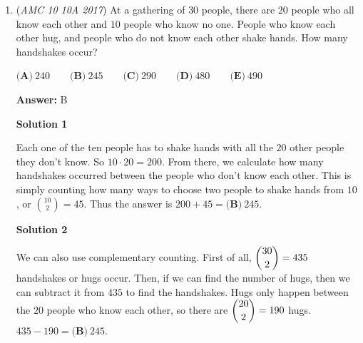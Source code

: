 \begin{enumerate}
Let $j$ represent how far Jerry walked, and $s$ represent how far Silvia walked. Since the field is a square, and Jerry walked two sides of it, while Silvia walked the diagonal, we can simply define the side of the square field to be one, and find the distances they walked. Since Jerry walked two sides, $j = 2$Since Silvia walked the diagonal, she walked the hypotenuse of a $45$, $45$, $90$ triangle with leg length $1$. Thus,$s = \sqrt{2} = 1.414...$We can then take $\frac{j-s}{j} \approx \frac{2 - 1.4}{2}=0.3 \implies \boxed{\textbf{(A)}\ 30\%}$




\textbf{Solution 2}

We can assume that Jerry's path is $100$ units in length. By that logic, Silvia's path is $\frac{100\cdot\sqrt{2}}{2}=50\sqrt{2}$. We can assume that $\sqrt{2}\approx1.4$, so we find that Sylvia's path is $70$ units in length. We can now subtract the two paths, and find out that the answer is $\boxed{\textbf{(A)}\ 30\%}$.~demonhunter

 (TheBeautyofMath)

 


	\item (\textit{AMC 10 10A 2017}) At a gathering of $30$ people, there are $20$ people who all know each other and $10$ people who know no one. People who know each other hug, and people who do not know each other shake hands. How many handshakes occur?


 $\textbf{(A)}\ 240\qquad\textbf{(B)}\ 245\qquad\textbf{(C)}\ 290\qquad\textbf{(D)}\ 480\qquad\textbf{(E)}\ 490$

 \textbf{Answer: }B



\textbf{Solution 1}

Each one of the ten people has to shake hands with all the $20$ other people they don’t know. So $10\cdot20 = 200$. From there, we calculate how many handshakes occurred between the people who don’t know each other. This is simply counting how many ways to choose two people to shake hands from $10$, or $\binom{10}{2} = 45$. Thus the answer is $200 + 45 = \boxed{\textbf{(B)}\ 245}$.

 



\textbf{Solution 2}

We can also use complementary counting. First of all, $\dbinom{30}{2}=435$ handshakes or hugs occur. Then, if we can find the number of hugs, then we can subtract it from $435$ to find the handshakes. Hugs only happen between the $20$ people who know each other, so there are $\dbinom{20}{2}=190$ hugs. $435-190= \boxed{\textbf{(B)}\ 245}$.


\end{enumerate}
